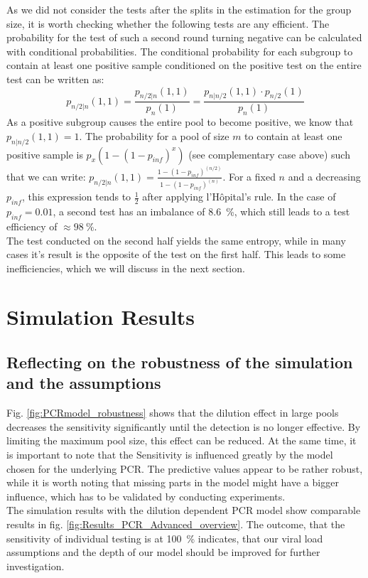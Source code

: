 \documentclass[fleqn,10pt]{wlscirep}
\begin{document}
	As we did not consider the tests after the splits in the estimation for the group size, it is worth checking whether the following tests are any efficient. The probability for the test of such a second round turning negative can be calculated with conditional probabilities. The conditional probability for each subgroup to contain at least one positive sample conditioned on the positive test on the entire test can be written as:
	$$p_{n/2|n}(1,1) = \frac{p_{n/2|n}(1,1)}{p_n(1)} = \frac{p_{n|n/2}(1,1)\cdot p_{n/2}(1)}{p_n(1)}$$
	As a positive subgroup causes the entire pool to become positive, we know that $p_{n|n/2}(1,1) = 1$. The probability for a pool of size $m$ to contain at least one positive sample is $p_x(1-(1-p_{inf})^x)$ (see complementary case above) such that we can write:
	$p_{n/2|n}(1,1) = \frac{1-(1-p_{inf})^(n/2)}{1-(1-p_{inf})^(n)}$. For a fixed $n$ and a decreasing $p_{inf}$, this expression tends to $\frac{1}{2}$ after applying l’Hôpital’s rule. In the case of $p_{inf} = 0.01$, a second test has an imbalance of \SI{8.6}{\percent}, which still leads to a test efficiency of $\approx \SI{98}{\percent}$. \\
	
	The test conducted on the second half yields the same entropy, while in many cases it’s result is the opposite of the test on the first half. This leads to some inefficiencies, which we will discuss in the next section.
	
	
	\section{Simulation Results}
	
	\subsection{Reflecting on the robustness of the simulation and the assumptions}
	Fig. \ref{fig:PCRmodel_robustness} shows that the dilution effect in large pools decreases the sensitivity significantly until the detection is no longer effective. By limiting the maximum pool size, this effect can be reduced. At the same time, it is important to note that the Sensitivity is influenced greatly by the model chosen for the underlying PCR. The predictive values appear to be rather robust, while it is worth noting that missing parts in the model might have a bigger influence, which has to be validated by conducting experiments.\\
	
	The simulation results with the dilution dependent PCR model show comparable results in fig. \ref{fig:Results_PCR_Advanced_overview}. The outcome, that the sensitivity of individual testing is at \SI{100}{\percent} indicates, that our viral load assumptions and the depth of our model should be improved for further investigation.
	
\end{document}
